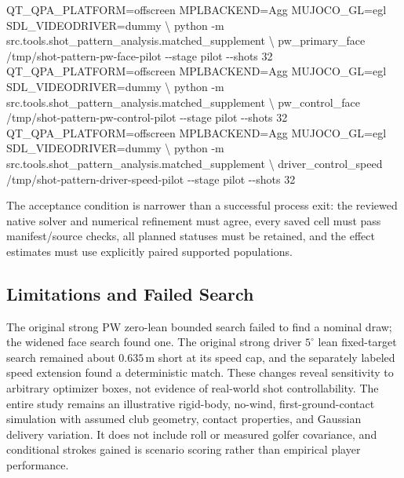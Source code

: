 \documentclass[
]{article}
\newenvironment{Shaded}{}{}
\newcommand{\AttributeTok}[1]{\textcolor[rgb]{0.49,0.56,0.16}{#1}}
\newcommand{\DataTypeTok}[1]{\textcolor[rgb]{0.56,0.13,0.00}{#1}}
\newcommand{\ExtensionTok}[1]{#1}
\newcommand{\NormalTok}[1]{#1}
\newcommand{\OperatorTok}[1]{\textcolor[rgb]{0.40,0.40,0.40}{#1}}
\newcommand{\VariableTok}[1]{\textcolor[rgb]{0.10,0.09,0.49}{#1}}
\begin{document}
\begin{Shaded}
\begin{Highlighting}[]
\VariableTok{QT\_QPA\_PLATFORM}\OperatorTok{=}\NormalTok{offscreen }\VariableTok{MPLBACKEND}\OperatorTok{=}\NormalTok{Agg }\VariableTok{MUJOCO\_GL}\OperatorTok{=}\NormalTok{egl }\VariableTok{SDL\_VIDEODRIVER}\OperatorTok{=}\NormalTok{dummy }\DataTypeTok{\textbackslash{}}
  \ExtensionTok{python} \AttributeTok{{-}m}\NormalTok{ src.tools.shot\_pattern\_analysis.matched\_supplement }\DataTypeTok{\textbackslash{}}
\NormalTok{  pw\_primary\_face /tmp/shot{-}pattern{-}pw{-}face{-}pilot }\AttributeTok{{-}{-}stage}\NormalTok{ pilot }\AttributeTok{{-}{-}shots}\NormalTok{ 32}
\VariableTok{QT\_QPA\_PLATFORM}\OperatorTok{=}\NormalTok{offscreen }\VariableTok{MPLBACKEND}\OperatorTok{=}\NormalTok{Agg }\VariableTok{MUJOCO\_GL}\OperatorTok{=}\NormalTok{egl }\VariableTok{SDL\_VIDEODRIVER}\OperatorTok{=}\NormalTok{dummy }\DataTypeTok{\textbackslash{}}
  \ExtensionTok{python} \AttributeTok{{-}m}\NormalTok{ src.tools.shot\_pattern\_analysis.matched\_supplement }\DataTypeTok{\textbackslash{}}
\NormalTok{  pw\_control\_face /tmp/shot{-}pattern{-}pw{-}control{-}pilot }\AttributeTok{{-}{-}stage}\NormalTok{ pilot }\AttributeTok{{-}{-}shots}\NormalTok{ 32}
\VariableTok{QT\_QPA\_PLATFORM}\OperatorTok{=}\NormalTok{offscreen }\VariableTok{MPLBACKEND}\OperatorTok{=}\NormalTok{Agg }\VariableTok{MUJOCO\_GL}\OperatorTok{=}\NormalTok{egl }\VariableTok{SDL\_VIDEODRIVER}\OperatorTok{=}\NormalTok{dummy }\DataTypeTok{\textbackslash{}}
  \ExtensionTok{python} \AttributeTok{{-}m}\NormalTok{ src.tools.shot\_pattern\_analysis.matched\_supplement }\DataTypeTok{\textbackslash{}}
\NormalTok{  driver\_control\_speed /tmp/shot{-}pattern{-}driver{-}speed{-}pilot }\AttributeTok{{-}{-}stage}\NormalTok{ pilot }\AttributeTok{{-}{-}shots}\NormalTok{ 32}
\end{Highlighting}
\end{Shaded}

The acceptance condition is narrower than a successful process exit: the
reviewed native solver and numerical refinement must agree, every saved
cell must pass manifest/source checks, all planned statuses must be
retained, and the effect estimates must use explicitly paired supported
populations.

\subsection{Limitations and Failed
Search}\label{limitations-and-failed-search}

The original strong PW zero-lean bounded search failed to find a nominal
draw; the widened face search found one. The original strong driver
\(5^\circ\) lean fixed-target search remained about
\(0.635\,\mathrm{m}\) short at its speed cap, and the separately labeled
speed extension found a deterministic match. These changes reveal
sensitivity to arbitrary optimizer boxes, not evidence of real-world
shot controllability. The entire study remains an illustrative
rigid-body, no-wind, first-ground-contact simulation with assumed club
geometry, contact properties, and Gaussian delivery variation. It does
not include roll or measured golfer covariance, and conditional strokes
gained is scenario scoring rather than empirical player performance.
\end{document}
